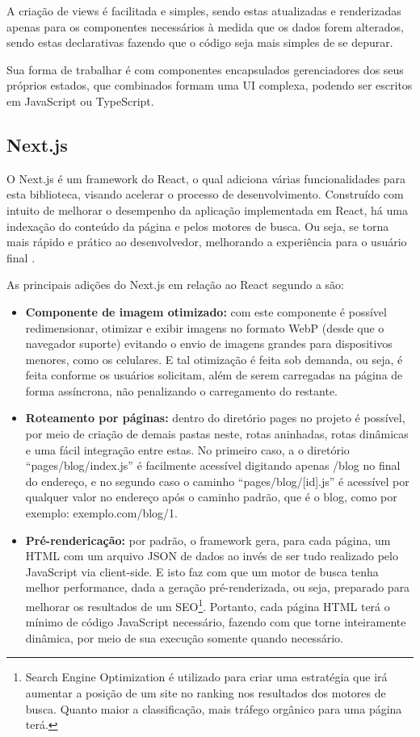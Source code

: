 A criação de views é facilitada e simples, sendo estas atualizadas e renderizadas apenas para os componentes necessários à medida que os dados forem alterados, sendo estas declarativas fazendo que o código seja mais simples de se depurar.

Sua forma de trabalhar é com componentes encapsulados gerenciadores dos seus próprios estados, que combinados formam uma UI complexa, podendo ser escritos em JavaScript ou TypeScript.

\subsection{Next.js}
O Next.js é um framework do React, o qual adiciona várias funcionalidades para esta biblioteca, visando acelerar o processo de desenvolvimento. Construído com intuito de melhorar o desempenho da aplicação implementada em React, há uma indexação do conteúdo da página e pelos motores de busca. Ou seja, se torna mais rápido e prático ao desenvolvedor, melhorando a experiência para o usuário final \cite{KONSHIN}.

As principais adições do Next.js em relação ao React segundo a  são:
\begin{itemize}
    \item \textbf{Componente de imagem otimizado:} com este componente é possível redimensionar, otimizar e exibir imagens no formato WebP (desde que o navegador suporte) evitando o envio de imagens grandes para dispositivos menores, como os celulares. E tal otimização é feita sob demanda, ou seja, é feita conforme os usuários solicitam, além de serem carregadas na página de forma assíncrona, não penalizando o carregamento do restante.
    \item \textbf{Roteamento por páginas:} dentro do diretório pages no projeto é possível, por meio de criação de demais pastas neste, rotas aninhadas, rotas dinâmicas e uma fácil integração entre estas. No primeiro caso, a o diretório “pages/blog/index.js” é facilmente acessível digitando apenas /blog no final do endereço, e no segundo caso o caminho “pages/blog/[id].js” é acessível por qualquer valor no endereço após o caminho padrão, que é o blog, como por exemplo: exemplo.com/blog/1.
    \item \textbf{Pré-rendericação:} por padrão, o framework gera, para cada página, um HTML com um arquivo JSON de dados ao invés de ser tudo realizado pelo JavaScript via client-side. E isto faz com que um motor de busca tenha melhor performance, dada a geração pré-renderizada, ou seja, preparado para melhorar os resultados de um SEO\footnote{Search Engine Optimization é utilizado para criar uma estratégia que irá aumentar a posição de um site no ranking nos resultados dos motores de busca. Quanto maior a classificação, mais tráfego orgânico para uma página terá.}. Portanto, cada página HTML terá o mínimo de código JavaScript necessário, fazendo com que torne inteiramente dinâmica, por meio de sua execução somente quando necessário.
\end{itemize}

